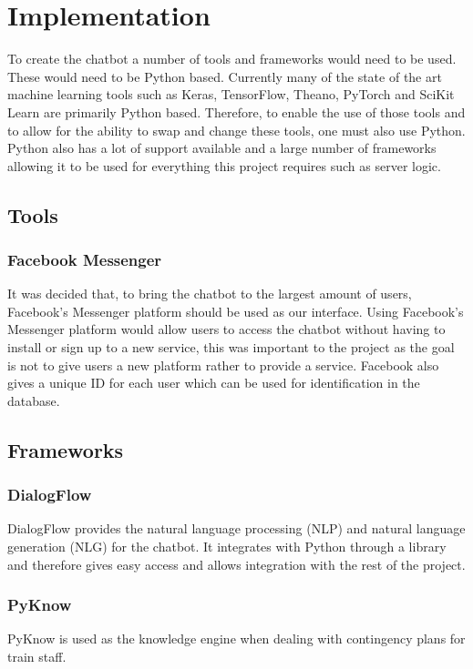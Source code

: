 \documentclass[12pt,a4paper]{article}
\begin{document}
    \section{Implementation}
    
    To create the chatbot a number of tools and frameworks would need to be used. These would need to be Python based. Currently many of the state of the art machine learning tools such as Keras, TensorFlow, Theano, PyTorch and SciKit Learn are primarily Python based. Therefore, to enable the use of those tools and to allow for the ability to swap and change these tools, one must also use Python. Python also has a lot of support available and a large number of frameworks allowing it to be used for everything this project requires such as server logic.
    
    \subsection{Tools}
    \subsubsection{Facebook Messenger}
    It was decided that, to bring the chatbot to the largest amount of users, Facebook's Messenger platform should be used as our interface. Using Facebook's Messenger platform would allow users to access the chatbot without having to install or sign up to a new service, this was important to the project as the goal is not to give users a new platform rather to provide a service. Facebook also gives a unique ID for each user which can be used for identification in the database.
    
    \subsection{Frameworks}
    
    \subsubsection{DialogFlow}
    DialogFlow provides the natural language processing (NLP) and natural language generation (NLG) for the chatbot. It integrates with Python through a library and therefore gives easy access and allows integration with the rest of the project.
    
    \subsubsection{PyKnow}
    PyKnow is used as the knowledge engine when dealing with contingency plans for train staff. 
    
\end{document}
